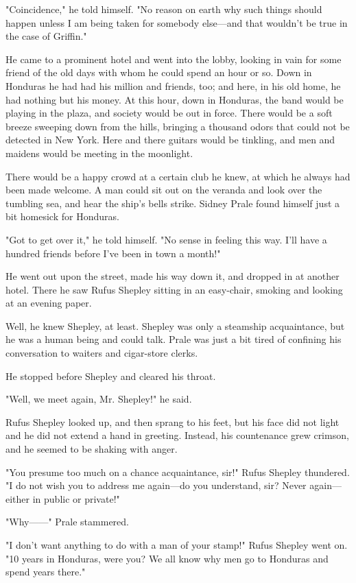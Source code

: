 \documentclass{novel}
\begin{document}
"Coincidence," he told himself. "No reason on earth why such things should happen unless I am being taken for somebody else---and that wouldn't be true in the case of Griffin."

He came to a prominent hotel and went into the lobby, looking in vain for some friend of the old days with whom he could spend an hour or so. Down in Honduras he had had his million and friends, too; and here, in his old home, he had nothing but his money. At this hour, down in Honduras, the band would be playing in the plaza, and society would be out in force. There would be a soft breeze sweeping down from the hills, bringing a thousand odors that could not be detected in New York. Here and there guitars would be tinkling, and men and maidens would be meeting in the moonlight.

There would be a happy crowd at a certain club he knew, at which he always had been made welcome. A man could sit out on the veranda and look over the tumbling sea, and hear the ship's bells strike. Sidney Prale found himself just a bit homesick for Honduras.

"Got to get over it," he told himself. "No sense in feeling this way. I'll have a hundred friends before I've been in town a month!"

He went out upon the street, made his way down it, and dropped in at another hotel. There he saw Rufus Shepley sitting in an easy-chair, smoking and looking at an evening paper.

Well, he knew Shepley, at least. Shepley was only a steamship acquaintance, but he was a human being and could talk. Prale was just a bit tired of confining his conversation to waiters and cigar-store clerks.

He stopped before Shepley and cleared his throat.

"Well, we meet again, Mr. Shepley!" he said.

Rufus Shepley looked up, and then sprang to his feet, but his face did not light and he did not extend a hand in greeting. Instead, his countenance grew crimson, and he seemed to be shaking with anger.

"You presume too much on a chance acquaintance, sir!" Rufus Shepley thundered. "I do not wish you to address me again---do you understand, sir? Never again---either in public or private!"

"Why------" Prale stammered.

"I don't want anything to do with a man of your stamp!" Rufus Shepley went on. "10 years in Honduras, were you? We all know why men go to Honduras and spend years there."
\end{document}
